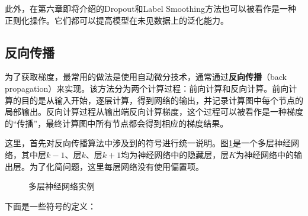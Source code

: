 \parinterval  此外，在第六章即将介绍的Dropout和Label Smoothing方法也可以被看作是一种正则化操作。它们都可以提高模型在未见数据上的泛化能力。


\subsection{反向传播}\label{sec:5.4.6}

\parinterval  为了获取梯度，最常用的做法是使用自动微分技术，通常通过{\small\sffamily\bfseries{反向传播}}（back propagation）来实现。该方法分为两个计算过程：前向计算和反向计算。前向计算的目的是从输入开始，逐层计算，得到网络的输出，并记录计算图中每个节点的局部输出。反向计算过程从输出端反向计算梯度，这个过程可以被看作是一种梯度的``传播''，最终计算图中所有节点都会得到相应的梯度结果。

\parinterval  这里，首先对反向传播算法中涉及到的符号进行统一说明。图\ref{fig:5-52}是一个多层神经网络，其中层$ k-1 $、层$ k $、层$ k+1 $均为神经网络中的隐藏层，层$ K $为神经网络中的输出层。为了化简问题，这里每层网络没有使用偏置项。

\begin{figure}[htp]
\centering

\caption{多层神经网络实例}
\label{fig:5-52}
\end{figure}

\parinterval  下面是一些符号的定义：

